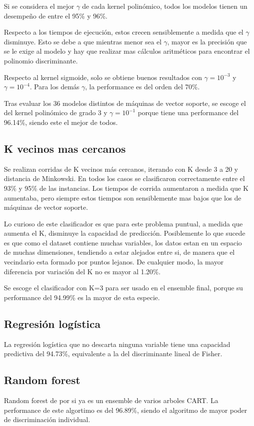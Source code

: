\documentclass[journal]{IEEEtran}
\begin{document}
Si se considera el mejor $\gamma$ de cada kernel polinómico, todos los modelos tienen un
desempeño de entre el 95\% y 96\%.

Respecto a los tiempos de ejecución, estos crecen sensiblemente a medida que el $\gamma$ 
disminuye. Esto se debe a que mientras menor sea el $\gamma$, mayor es la precisión que 
se le exige al modelo y hay que realizar  mas cálculos aritméticos para encontrar
el polinomio discriminante. 

Respecto al kernel sigmoide, solo se obtiene buenos resultados con $\gamma=10^{-3}$
y $\gamma=10^{-4}$. Para los demás $\gamma$, la performance es del orden del
70\%.

Tras evaluar los 36 modelos distintos de máquinas de vector soporte, se escoge
el del kernel polinómico de grado 3 y $\gamma=10^{-1}$ porque tiene una performance del
96.14\%, siendo este el mejor de todos.

\subsection{K vecinos mas cercanos}
Se realizan corridas de K vecinos más cercanos, iterando con K desde
3 a 20 y distancia de Minkowski. En todos los casos se clasificaron
correctamente entre el 93\% y 95\% de las instancias. Los tiempos de corrida aumentaron
a medida que K aumentaba, pero siempre estos tiempos son sensiblemente
mas bajos que los de máquinas de vector soporte.

Lo curioso de este clasificador es que para este problema puntual, a medida
que aumenta el K, disminuye la capacidad de predicción. Posiblemente
lo que sucede es que como el dataset contiene muchas variables, 
los datos estan en un espacio de muchas dimensiones, 
tendiendo a estar alejados entre si, de manera que
el vecindario esta formado por puntos lejanos.
De cualquier modo, la mayor diferencia por variación del K 
 no es mayor al 1.20\%.

Se escoge el clasificador con K=3 para ser usado en el ensemble final,
porque su performance del 94.99\% es la mayor de esta especie.

\subsection{Regresión logística}
La regresión logística que no descarta ninguna variable tiene 
una capacidad predictiva del 94.73\%, equivalente a la del
discriminante lineal de Fisher.

\subsection{Random forest}
Random forest de por si ya es un ensemble de varios arboles
CART. La performance de este algortimo es del 96.89\%,
siendo el algoritmo de mayor poder de discriminación  individual. 
\end{document}
